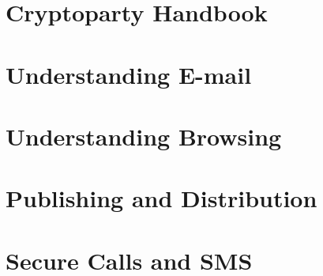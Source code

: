 \documentclass[oribibl,a4paper]{book}
\begin{document}
\graphicspath{{chapter_00_cryptoparty_handbook}}
\chapter{Cryptoparty Handbook}

\clearpage

\clearpage

\clearpage

\clearpage

\clearpage
\graphicspath{{chapter_01_understanding_email}}
\chapter{Understanding E-mail}

\clearpage

\clearpage

\clearpage

\clearpage

\clearpage
\graphicspath{{chapter_02_understanding_browsing}}
\chapter{Understanding Browsing}

\clearpage

\clearpage

\clearpage

\clearpage

\clearpage

\clearpage

\clearpage
\chapter{Publishing and Distribution}

\clearpage

\clearpage

\clearpage
\chapter{Secure Calls and SMS}

\clearpage

\clearpage
\graphicspath{{./chapter_05_basic_email_security/}}
\end{document}
